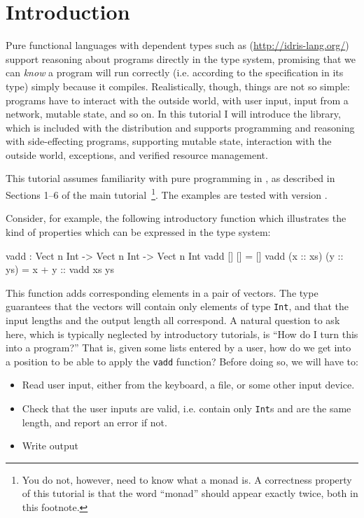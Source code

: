 \section{Introduction}

Pure functional languages with dependent types such as \Idris{}
(\url{http://idris-lang.org/})
support reasoning about programs directly in the type system, promising that we
can \emph{know} a program will run correctly (i.e. according to the
specification in its type) simply because it compiles. Realistically, though,
things are not so simple: programs have to interact with the outside world,
with user input, input from a network, mutable state, and so on. In this
tutorial I will introduce the \effects{} library, which is included with
the \Idris{} distribution and supports programming and reasoning with
side-effecting programs, supporting mutable state, interaction with the
outside world, exceptions, and verified resource management.

This tutorial assumes familiarity with pure programming in \Idris{}, as
described in Sections 1--6 of the main
tutorial~\cite{idris-tutorial}\footnote{You do not, however, need to know what
a monad is. A correctness property of this tutorial is that the word ``monad''
should appear exactly twice, both in this footnote.}. The examples are
tested with \Idris{} version \version{}.

Consider, for example, the following introductory function which illustrates
the kind of properties which can be expressed in the type system:

\begin{code}
vadd : Vect n Int -> Vect n Int -> Vect n Int
vadd []        []        = []
vadd (x :: xs) (y :: ys) = x + y :: vadd xs ys
\end{code}

This function adds corresponding elements in a pair of vectors. The type
guarantees that the vectors will contain only elements of type \texttt{Int},
and that the input lengths and the output length all correspond. A natural
question to ask here, which is typically neglected by introductory tutorials,
is ``How do I turn this into a program?'' That is, given some lists entered
by a user, how do we get into a position to be able to apply the 
\texttt{vadd} function? Before doing so, we will have to:

\begin{itemize}
\item Read user input, either from the keyboard, a file, or some other input device.
\item Check that the user inputs are valid, i.e. contain only \texttt{Int}s and
are the same length, and report an error if not.
\item Write output
\end{itemize}

